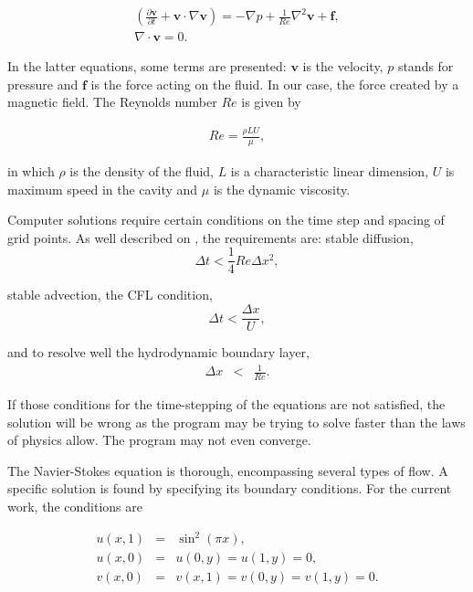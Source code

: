 \documentclass[journal]{IEEEtran}
\begin{document}
\begin{eqnarray}
\left( \frac{\partial {\textbf{v}}}{\partial t}+\textbf{v}\cdot\nabla \textbf{v} \right)=-\nabla p+\frac{1}{\mathit{Re}}\nabla^2 \textbf{v} + \textbf{f}\label{navierstokes},\\
\nabla\cdot\textbf{v}=0.\label{navierincompressibilidade}
\end{eqnarray}

In the latter equations, some terms are presented: $\mathbf{v}$ is the velocity, $p$ stands for pressure and $\mathbf{f}$ is the force acting on the fluid. In our case, the force created by a magnetic field. The Reynolds number $\mathit{Re}$ is given by 

\begin{eqnarray}
\mathit{Re}=\frac{\rho L U}{\mu},
\end{eqnarray}

in which $\rho$ is the density of the fluid, $L$ is a characteristic linear dimension, $U$ is maximum speed in the cavity and $\mu$ is the dynamic viscosity.

Computer solutions require certain conditions on the time step and spacing of grid points. As well described on \cite{hinchLectureNotes}, the requirements are: stable diffusion, 
\begin{equation}
\Delta t < \frac{1}{4}\mathit{Re}\Delta x^2, \label{stablediffusion}
\end{equation} 

stable advection, the CFL condition,
\begin{equation}
\Delta t < \frac{\Delta x}{U}, \label{stableadvection}
\end{equation}

 and to resolve well the hydrodynamic boundary layer,  
 \begin{eqnarray}
\Delta x &<& \frac{1}{\mathit{Re}}. \label{boundarylayer}
\end{eqnarray} 

If those conditions for the time-stepping of the equations are not satisfied, the solution will be wrong as the program may be trying to solve faster than the laws of physics allow. The program may not even converge.


The Navier-Stokes equation is thorough, encompassing several types of flow. A specific solution is found by specifying its boundary conditions. For the current work, the conditions are

\begin{eqnarray}
u(x,1) & = & \sin^2(\pi x),\\
u(x,0) & = & u(0,y) = u(1,y) = 0,\\
v(x,0) & = & v(x,1) = v(0, y) = v(1, y) = 0.
\end{eqnarray}
\end{document}
